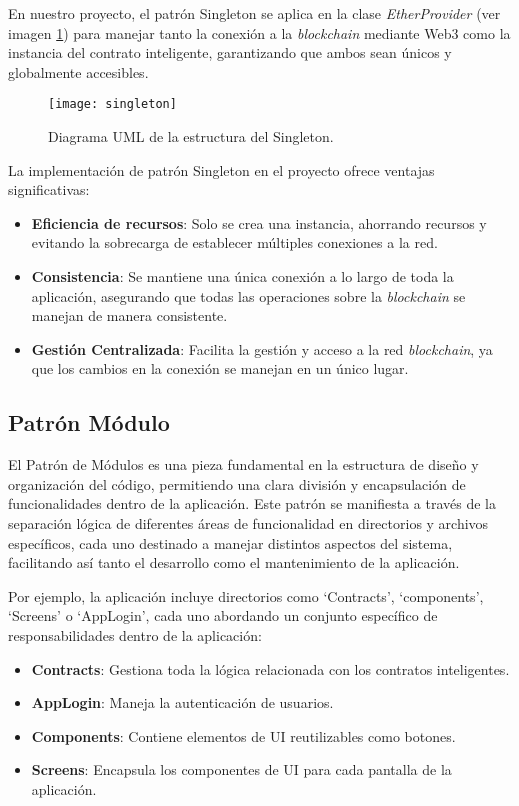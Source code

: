 En nuestro proyecto, el patrón Singleton se aplica en la clase \textit{EtherProvider} (ver imagen \ref{img:singleton}) para manejar tanto la conexión a la \textit{blockchain} mediante Web3 como la instancia del contrato inteligente, garantizando que ambos sean únicos y globalmente accesibles.

\begin{figure}[h]
	\label{img:singleton}
	\centering
	\texttt{[image: singleton]}
	\caption[Diagrama Singleton]{Diagrama UML de la estructura del Singleton.}
\end{figure}

La implementación de patrón Singleton en el proyecto ofrece ventajas significativas: 

\begin{itemize}
\item \textbf{Eficiencia de recursos}: Solo se crea una instancia, ahorrando recursos y evitando la sobrecarga de establecer múltiples conexiones a la red.

\item \textbf{Consistencia}: Se mantiene una única conexión a lo largo de toda la aplicación, asegurando que todas las operaciones sobre la \textit{blockchain} se manejan de manera consistente.

\item \textbf{Gestión Centralizada}: Facilita la gestión y acceso a la red \textit{blockchain}, ya que los cambios en la conexión se manejan en un único lugar.
\end{itemize}

\subsection{Patrón Módulo}

El Patrón de Módulos es una pieza fundamental en la estructura de diseño y organización del código, permitiendo una clara división y encapsulación de funcionalidades dentro de la aplicación. Este patrón se manifiesta a través de la separación lógica de diferentes áreas de funcionalidad en directorios y archivos específicos, cada uno destinado a manejar distintos aspectos del sistema, facilitando así tanto el desarrollo como el mantenimiento de la aplicación.

Por ejemplo, la aplicación incluye directorios como `Contracts', `components', `Screens' o `AppLogin', cada uno abordando un conjunto específico de responsabilidades dentro de la aplicación:

\begin{itemize}
\item \textbf{Contracts}: Gestiona toda la lógica relacionada con los contratos inteligentes.

\item \textbf{AppLogin}: Maneja la autenticación de usuarios.

\item \textbf{Components}: Contiene elementos de UI reutilizables como botones.

\item \textbf{Screens}: Encapsula los componentes de UI para cada pantalla de la aplicación.
\end{itemize}

